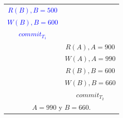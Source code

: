 \documentclass{templateNote}
\begin{document}
\begin{itemize}
\begin{itemize}
\begin{itemize}
\begin{figure}[H]
\begin{minipage}{0.3\textwidth}
{\begin{tabular}{|c|c|}
                        \textcolor{blue}{$R(B), B = 500$} & \\
                        \textcolor{blue}{$W(B), B = 600$} & \\
                        \textcolor{blue}{\textit{$commit_{T_1}$}} & \\ \hline
                        & \textcolor{green!80!black}{$R(A), A = 900$} \\
                        & \textcolor{green!80!black}{$W(A), A = 990$} \\
                        & \textcolor{green!80!black}{$R(B), B = 600$} \\
                        & \textcolor{green!80!black}{$W(B), B = 660$} \\
                        & \textcolor{green!80!black}{\textit{$commit_{T_2}$}} \\ \hline
                        \multicolumn{2}{|c|}{$A = 990$ y $B = 660$.} \\ \hline
                    \end{tabular}
                    }
                \end{minipage}
                \begin{minipage}{0.3\textwidth}
                \end{minipage}
            \end{figure}


\end{itemize}
\end{itemize}
\end{itemize}
\end{document}
